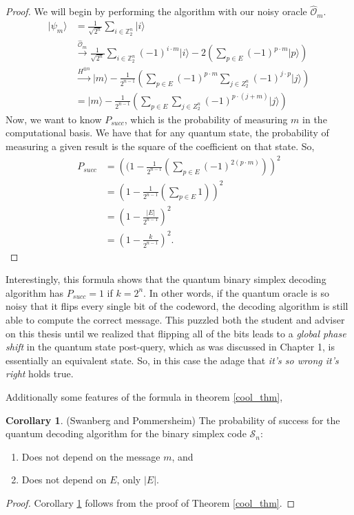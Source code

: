 \documentclass[12pt,twoside]{reedthesis}
\theoremstyle{definition}
\newtheorem{corollary}[theorem]{Corollary}
\newcommand{\Z}{\mathbb{Z}}
\newcommand{\ket}[1]{\ensuremath{\lvert #1\rangle}\xspace}
\begin{document}
\begin{proof}
We will begin by performing the algorithm with our noisy oracle $\widehat{\mathcal{O}}_m$.
\begin{align*}
\ket{\psi_m} 
& = \frac{1}{\sqrt{2^n}} \sum_{i \in \Z_2^n} \ket{i} \\
& \xrightarrow{\widehat{\mathcal{O}}_m} \frac{1}{\sqrt{2^n}} \sum_{i \in \Z_2^n} (-1)^{i \cdot m}\ket{i} -2\left( \sum_{p \in E} (-1)^{p \cdot m} \ket{p}\right) \\
& \xrightarrow{H^{\otimes n}} \ket{m} - \frac{1}{2^{n-1}} \left( \sum_{p \in E}(-1)^{p \cdot m} \sum_{j \in Z_2^n} (-1)^{j \cdot p} \ket{j}\right)\\
& = \ket{m} - \frac{1}{2^{n-1}} \left( \sum_{p \in E}\sum_{j \in Z_2^n} (-1)^{p \cdot(j+m)} \ket{j} \right)
\end{align*}
Now, we want to know $P_{succ}$, which is the probability of measuring $m$ in the computational basis. We have that for any quantum state, the probability of measuring a given result is the square of the coefficient on that state. So,
\begin{align*}
P_{succ} 
& = \left((1 - \frac{1}{2^{n-1}} \left( \sum_{p \in E} (-1)^{2(p \cdot m)} \right)\right)^2 \\
& = \left(1 - \frac{1}{2^{n-1}} \left( \sum_{p \in E} 1 \right) \right)^2 \\
& = \left( 1 - \frac{\lvert E \rvert}{2^{n-1}}\right)^2\\
& = \left( 1 - \frac{k}{2^{n-1}}\right)^2.
\end{align*}
\end{proof}
Interestingly, this formula shows that the quantum binary simplex decoding algorithm has $P_{succ} = 1$ if $k = 2^n$. In other words, if the quantum oracle is so noisy that it flips every single bit of the codeword, the decoding algorithm is still able to compute the correct message. This puzzled both the student and adviser on this thesis until we realized that flipping all of the bits leads to a \textit{global phase shift} in the quantum state post-query, which as was discussed in Chapter 1, is essentially an equivalent state. So, in this case the adage that \textit{it's so wrong it's right} holds true.

Additionally some features of the formula in theorem \ref{cool_thm}, 
\begin{corollary} \label{corollary}(Swanberg and Pommersheim) The probability of success for the quantum decoding algorithm for the binary simplex code $\mathcal{S}_n$:
\begin{enumerate}
\item Does not depend on the message $m$, and
\item Does not depend on $E$, only $\lvert E \rvert$.
\end{enumerate} 
\end{corollary}
\begin{proof}
Corollary \ref{corollary} follows from the proof of Theorem \ref{cool_thm}.
\end{proof}
\end{document}
